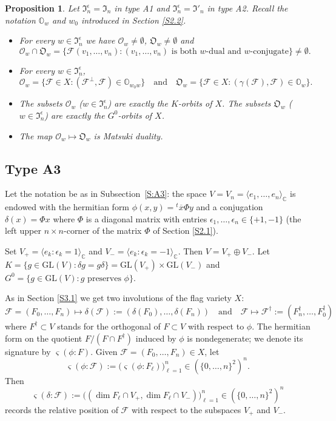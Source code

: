\documentclass{amsart}
\newtheorem{proposition}{Proposition}
\theoremstyle{definition}
\begin{document}
\begin{proposition}
\label{P1} Let $\mathfrak{I}_n^\epsilon=\mathfrak{I}_n$ in type A1
and $\mathfrak{I}_n^\epsilon=\mathfrak{I}'_n$ in type A2. Recall the notation
$\mathbb{O}_w$ and $w_0$ introduced in Section \ref{S2.2}.
\begin{itemize}
\item[\rm (a)]
For every $w\in\mathfrak{I}_n^\epsilon$ we have
$\mathcal{O}_w\not=\emptyset$, $\mathfrak{O}_w\not=\emptyset$
and 
\[\mathcal{O}_w\cap\mathfrak{O}_w=\{\mathcal{F}(v_1,\ldots,v_n):\mbox{$(v_1,\ldots,v_n)$ is both $w$-dual and $w$-conjugate}\}\not=\emptyset.\]
\item[\rm (b)]
For every $w\in \mathfrak{I}_n^\epsilon$,
\[
\mathcal{O}_w=\{\mathcal{F}\in
X:(\mathcal{F}^\perp,\mathcal{F})\in\mathbb{O}_{w_0w}\}
\quad\mbox{and}\quad \mathfrak{O}_w=\{\mathcal{F}\in
X:(\gamma(\mathcal{F}),\mathcal{F})\in\mathbb{O}_{w}\}.
\]
\item[\rm (c)]
The subsets $\mathcal{O}_w$ ($w\in\mathfrak{I}_n^\epsilon$) are
exactly the $K$-orbits of $X$. The subsets $\mathfrak{O}_w$
($w\in\mathfrak{I}_n^\epsilon$) are exactly the $G^0$-orbits of $X$.
\item[\rm (d)]
The map $\mathcal{O}_w\mapsto\mathfrak{O}_w$ is Matsuki duality.
\end{itemize}
\end{proposition}

\subsection{Type A3} 
\label{S3.2}
Let the notation be as in Subsection~\ref{S:A3}: the space $V=V_n=\langle e_1,\ldots,e_n\rangle_\mathbb{C}$ is endowed with the hermitian form $\phi(x,y)={}^t\overline{x}\Phi y$ and a conjugation $\delta(x)=\Phi x$ where $\Phi$ is a diagonal matrix with entries $\epsilon_1,\ldots,\epsilon_n\in\{+1,-1\}$ (the left upper $n\times n$-corner of the matrix $\Phi$ of Section \ref{S2.1}).

Set $V_+=\langle e_k:\epsilon_k=1\rangle_\mathbb{C}$ and $V_-=\langle e_k:\epsilon_k=-1\rangle_\mathbb{C}$.  Then $V=V_+\oplus V_-$.
Let $K=\{g\in\mathrm{GL}(V):\delta g=g\delta\}=\mathrm{GL}(V_+)\times\mathrm{GL}(V_-)$ and $G^0=\{g\in \mathrm{GL}(V):\mbox{$g$ preserves $\phi$}\}$.

As in Section \ref{S3.1} we get two involutions of the flag variety $X$:
\[\mathcal{F}=(F_0,\ldots,F_n)\mapsto\delta(\mathcal{F}):=(\delta(F_0),\ldots,\delta(F_n))\quad\mbox{and}\quad\mathcal{F}\mapsto\mathcal{F}^\dag:=(F_n^\dag,\ldots,F_0^\dag)\]
where $F^\dag\subset V$ stands for the orthogonal of $F\subset V$ with respect to $\phi$. 
The hermitian form on the quotient $F/(F\cap F^\dag)$ induced by $\phi$ is
nondegenerate; we denote its signature by $\varsigma(\phi:F)$. Given $\mathcal{F}=(F_0,\ldots,F_n)\in X$, let
\[\varsigma(\phi:\mathcal{F}):=\big(\varsigma(\phi:F_\ell)\big)_{\ell=1}^n\in(\{0,\ldots,n\}^2)^n.\]
Then
\[\varsigma(\delta:\mathcal{F}):=\big((\dim F_\ell\cap V_+,\dim F_\ell\cap V_-)\big)_{\ell=1}^n\in(\{0,\ldots,n\}^2)^n\]
records the relative position of $\mathcal{F}$ with respect to the subspaces
$V_+$ and
$V_-$.
\end{document}
